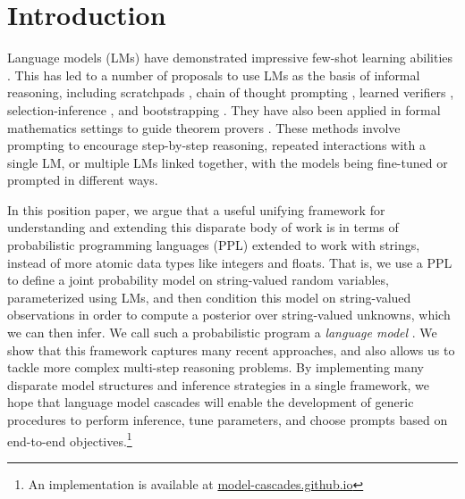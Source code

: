 \section{Introduction}
\label{introduction}

Language models (LMs) have demonstrated impressive few-shot learning abilities \citep{gpt3,palm}. This has led
to a number of proposals to use LMs as the basis of informal reasoning,
including scratchpads \citep{scratchpads}, chain of thought prompting \citep{chainofthought,selfconsistency}, learned verifiers \citep{verifiers}, selection-inference \citep{selection_inference}, and bootstrapping \citep{zelikman2022star}. They have also been applied in formal mathematics settings to guide theorem provers \citep{gptf}. 
These methods involve prompting to encourage step-by-step reasoning, repeated interactions with a single LM, or multiple LMs
linked together, with the models being fine-tuned or prompted in different ways. 

In this position paper, we argue that a useful unifying framework for understanding and extending this disparate body of work is in terms of probabilistic programming languages (PPL) extended to work with strings, instead of more atomic data types like integers and floats.
That is, we use a PPL to define a joint probability model on string-valued random variables, parameterized using LMs, and then condition this model on string-valued observations in order to compute a posterior over string-valued unknowns, which we can then infer.
We call such a probabilistic program a \emph{language model \cascade}.
We show that this framework captures many recent approaches, and also allows us to tackle more complex multi-step reasoning problems.
By implementing many disparate model structures and inference strategies in a single framework, we hope that language model cascades will enable
the development of generic procedures to perform inference, tune parameters, and choose prompts based on end-to-end objectives.\footnote{An implementation is available at \url{model-cascades.github.io}}